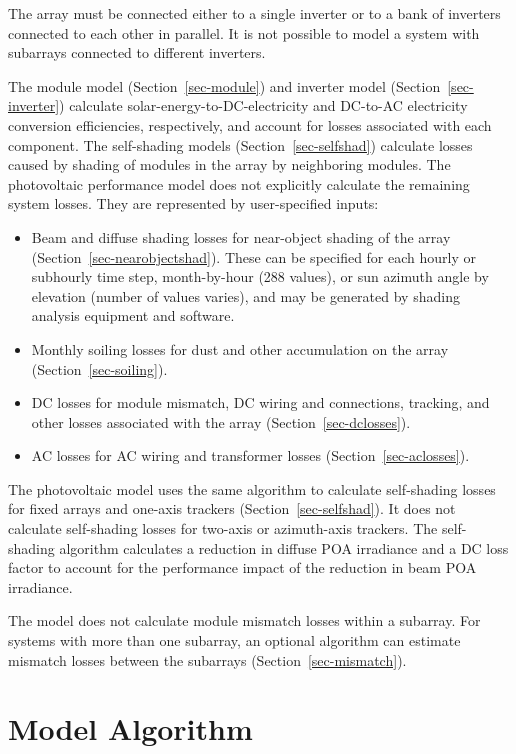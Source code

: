 \documentclass[12pt,letterpaper]{article}
\begin{document}
The array must be connected either to a single inverter or to a bank of inverters connected to each other in parallel. It is not possible to model a system with subarrays connected to different inverters.

The module model (Section~\ref{sec-module}) and inverter model (Section~\ref{sec-inverter}) calculate solar-energy-to-DC-electricity and DC-to-AC electricity conversion efficiencies, respectively, and account for losses associated with each component. The self-shading models (Section~\ref{sec-selfshad}) calculate losses caused by shading of modules in the array by neighboring modules. The photovoltaic performance model does not explicitly calculate the remaining system losses. They are represented by user-specified inputs:

\begin{itemize}
\item{Beam and diffuse shading losses for near-object shading of the array (Section~\ref{sec-nearobjectshad}). These can be specified for each hourly or subhourly time step, month-by-hour (288 values), or sun azimuth angle by elevation (number of values varies), and may be generated by shading analysis equipment and software.}
\item{Monthly soiling losses for dust and other accumulation on the array (Section~\ref{sec-soiling}).}
\item{DC losses for module mismatch, DC wiring and connections, tracking, and other losses associated with the array (Section~\ref{sec-dclosses}).}
\item{AC losses for AC wiring and transformer losses (Section~\ref{sec-aclosses}).}
\end{itemize}

The photovoltaic model uses the same algorithm to calculate self-shading losses for fixed arrays and one-axis trackers (Section~\ref{sec-selfshad}). It does not calculate self-shading losses for two-axis or azimuth-axis trackers. The self-shading algorithm calculates a reduction in diffuse POA irradiance and a DC loss factor to account for the performance impact of the reduction in beam POA irradiance.

The model does not calculate module mismatch losses within a subarray. For systems with more than one subarray, an optional algorithm can estimate mismatch losses between the subarrays (Section~\ref{sec-mismatch}).

\section{Model Algorithm}
\end{document}
